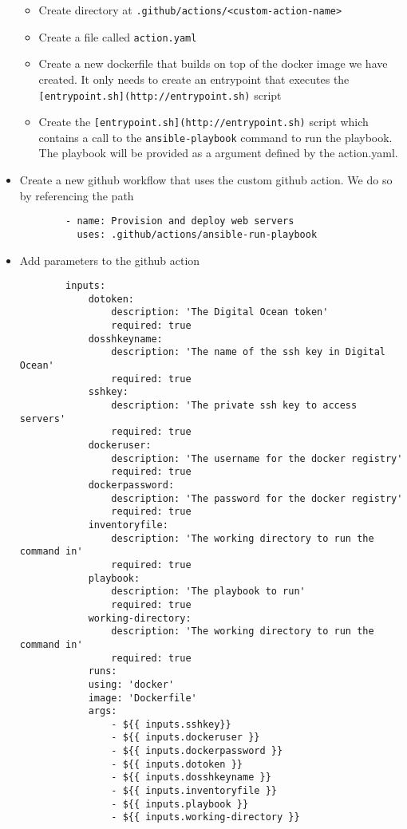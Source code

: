 \begin{itemize}
    \begin{itemize}
        \item Create directory at \texttt{.github/actions/\textless{}custom-action-name\textgreater{}}
        \item Create a file called \texttt{action.yaml}
        \item Create a new dockerfile that builds on top of the docker image we have created. It only needs to create an entrypoint that executes the \texttt{{[}entrypoint.sh{]}(http://entrypoint.sh)} script
        \item Create the \texttt{{[}entrypoint.sh{]}(http://entrypoint.sh)} script which contains a call to the \texttt{ansible-playbook} command to run the playbook. The playbook will be provided as a argument defined by the action.yaml.
    \end{itemize}
    \item Create a new github workflow that uses the custom github action. We do so by referencing the path

    \begin{verbatim}
        - name: Provision and deploy web servers
          uses: .github/actions/ansible-run-playbook
    \end{verbatim}
    \item Add parameters to the github action

    \begin{verbatim}
        inputs:
            dotoken:
                description: 'The Digital Ocean token'
                required: true
            dosshkeyname:
                description: 'The name of the ssh key in Digital Ocean'
                required: true
            sshkey:
                description: 'The private ssh key to access servers'
                required: true
            dockeruser:
                description: 'The username for the docker registry'
                required: true
            dockerpassword:
                description: 'The password for the docker registry'
                required: true
            inventoryfile:
                description: 'The working directory to run the command in'
                required: true
            playbook:
                description: 'The playbook to run'
                required: true
            working-directory:
                description: 'The working directory to run the command in'
                required: true
            runs:
            using: 'docker'
            image: 'Dockerfile'
            args:
                - ${{ inputs.sshkey}}
                - ${{ inputs.dockeruser }}
                - ${{ inputs.dockerpassword }}
                - ${{ inputs.dotoken }}
                - ${{ inputs.dosshkeyname }}
                - ${{ inputs.inventoryfile }}
                - ${{ inputs.playbook }}
                - ${{ inputs.working-directory }}
    \end{verbatim}


\end{itemize}
